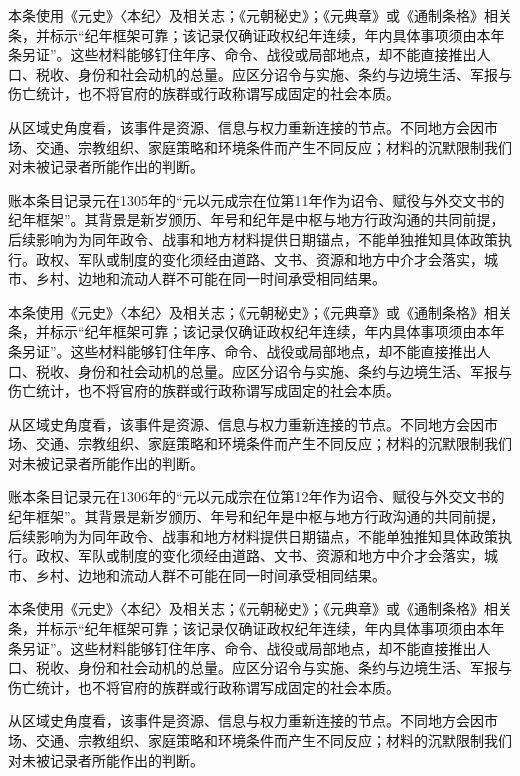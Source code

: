 本条使用《元史》〈本纪〉及相关志；《元朝秘史》；《元典章》或《通制条格》相关条，并标示“纪年框架可靠；该记录仅确证政权纪年连续，年内具体事项须由本年条另证”。这些材料能够钉住年序、命令、战役或局部地点，却不能直接推出人口、税收、身份和社会动机的总量。应区分诏令与实施、条约与边境生活、军报与伤亡统计，也不将官府的族群或行政称谓写成固定的社会本质。

从区域史角度看，该事件是资源、信息与权力重新连接的节点。不同地方会因市场、交通、宗教组织、家庭策略和环境条件而产生不同反应；材料的沉默限制我们对未被记录者所能作出的判断。

账本条目记录元在1305年的“元以元成宗在位第11年作为诏令、赋役与外交文书的纪年框架”。其背景是新岁颁历、年号和纪年是中枢与地方行政沟通的共同前提，后续影响为为同年政令、战事和地方材料提供日期锚点，不能单独推知具体政策执行。政权、军队或制度的变化须经由道路、文书、资源和地方中介才会落实，城市、乡村、边地和流动人群不可能在同一时间承受相同结果。

本条使用《元史》〈本纪〉及相关志；《元朝秘史》；《元典章》或《通制条格》相关条，并标示“纪年框架可靠；该记录仅确证政权纪年连续，年内具体事项须由本年条另证”。这些材料能够钉住年序、命令、战役或局部地点，却不能直接推出人口、税收、身份和社会动机的总量。应区分诏令与实施、条约与边境生活、军报与伤亡统计，也不将官府的族群或行政称谓写成固定的社会本质。

从区域史角度看，该事件是资源、信息与权力重新连接的节点。不同地方会因市场、交通、宗教组织、家庭策略和环境条件而产生不同反应；材料的沉默限制我们对未被记录者所能作出的判断。

账本条目记录元在1306年的“元以元成宗在位第12年作为诏令、赋役与外交文书的纪年框架”。其背景是新岁颁历、年号和纪年是中枢与地方行政沟通的共同前提，后续影响为为同年政令、战事和地方材料提供日期锚点，不能单独推知具体政策执行。政权、军队或制度的变化须经由道路、文书、资源和地方中介才会落实，城市、乡村、边地和流动人群不可能在同一时间承受相同结果。

本条使用《元史》〈本纪〉及相关志；《元朝秘史》；《元典章》或《通制条格》相关条，并标示“纪年框架可靠；该记录仅确证政权纪年连续，年内具体事项须由本年条另证”。这些材料能够钉住年序、命令、战役或局部地点，却不能直接推出人口、税收、身份和社会动机的总量。应区分诏令与实施、条约与边境生活、军报与伤亡统计，也不将官府的族群或行政称谓写成固定的社会本质。

从区域史角度看，该事件是资源、信息与权力重新连接的节点。不同地方会因市场、交通、宗教组织、家庭策略和环境条件而产生不同反应；材料的沉默限制我们对未被记录者所能作出的判断。


